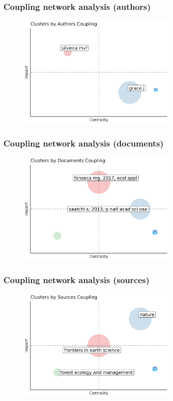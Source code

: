 \documentclass[aspectratio=169]{beamer}
\begin{document}
\begin{frame}
    \frametitle{Coupling network analysis (authors)}
    \begin{figure}
        \centering
        \includegraphics[width=0.7\textwidth]
        {figures/couplingmap_w_authors.png}
    \end{figure}
\end{frame}

\begin{frame}
    \frametitle{Coupling network analysis (documents)}
    \begin{figure}
        \centering
        \includegraphics[width=0.7\textwidth]
        {figures/couplingmap_w_documents.png}
    \end{figure}
\end{frame}

\begin{frame}
    \frametitle{Coupling network analysis (sources)}
    \begin{figure}
        \centering
        \includegraphics[width=0.7\textwidth]
        {figures/couplingmap_w_sources.png}
    \end{figure}
\end{frame}
\end{document}
